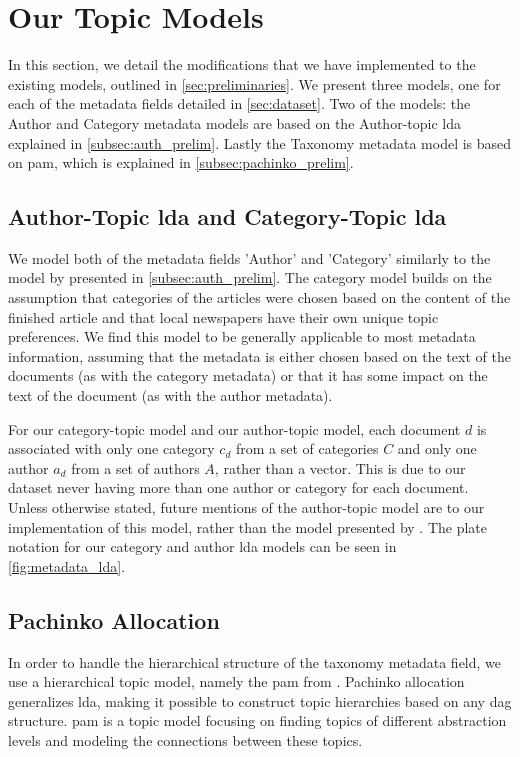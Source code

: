 \section{Our Topic Models}\label{sec:plate_notation}
In this section, we detail the modifications that we have implemented to the existing models, outlined in \autoref{sec:preliminaries}.
We present three models, one for each of the metadata fields detailed in \autoref{sec:dataset}.
Two of the models: the Author and Category metadata models are based on the Author-topic \gls{lda} explained in \autoref{subsec:auth_prelim}.
Lastly the Taxonomy metadata model is based on \gls{pam}, which is explained in \autoref{subsec:pachinko_prelim}.

\subsection{Author-Topic \gls{lda} and Category-Topic \gls{lda}}
We model both of the metadata fields 'Author' and 'Category' similarly to the model by \citet{author_topic_2012} presented in \autoref{subsec:auth_prelim}.
The category model builds on the assumption that categories of the articles were chosen based on the content of the finished article and that local newspapers have their own unique topic preferences.
We find this model to be generally applicable to most metadata information, assuming that the metadata is either chosen based on the text of the documents (as with the category metadata) or that it has some impact on the text of the document (as with the author metadata).

For our category-topic model and our author-topic model, each document $d$ is associated with only one category $c_d$ from a set of categories $C$ and only one author $a_d$ from a set of authors $A$, rather than a vector.
This is due to our dataset never having more than one author or category for each document.
Unless otherwise stated, future mentions of the author-topic model are to our implementation of this model, rather than the model presented by \citet{author_topic_2012}.
The plate notation for our category and author \gls{lda} models can be seen in \autoref{fig:metadata_lda}.

\subsection{Pachinko Allocation}
In order to handle the hierarchical structure of the taxonomy metadata field, we use a hierarchical topic model, namely the \acrfull{pam} from \citet{li2006pachinko}.
Pachinko allocation generalizes \gls{lda}, making it possible to construct topic hierarchies based on any \gls{dag} structure.
\gls{pam} is a topic model focusing on finding topics of different abstraction levels and modeling the connections between these topics.

